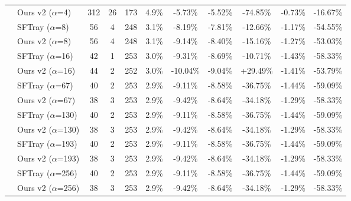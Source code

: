 \begin{table}[t]
{\begin{tabular}{ll|cccc|ccc|cc}
 & Ours v2 ($\alpha$=4) & 312 & 26 & 173 & 4.9\% & -5.73\% & -5.52\% & -74.85\% & -0.73\% & -16.67\% \\

\addlinespace[0.3em]

 & SFTray ($\alpha$=8) & 56 & 4 & 248 & 3.1\% & -8.19\% & -7.81\% & -12.66\% & -1.17\% & -54.55\% \\

 & Ours v2 ($\alpha$=8) & 56 & 4 & 248 & 3.1\% & -9.14\% & -8.40\% & -15.16\% & -1.27\% & -53.03\% \\

\addlinespace[0.3em]

 & SFTray ($\alpha$=16) & 42 & 1 & 253 & 3.0\% & -9.31\% & -8.69\% & -10.71\% & -1.43\% & -58.33\% \\

 & Ours v2 ($\alpha$=16) & 44 & 2 & 252 & 3.0\% & -10.04\% & -9.04\% & +29.49\% & -1.41\% & -53.79\% \\

\addlinespace[0.3em]

 & SFTray ($\alpha$=67) & 40 & 2 & 253 & 2.9\% & -9.11\% & -8.58\% & -36.75\% & -1.44\% & -59.09\% \\

 & Ours v2 ($\alpha$=67) & 38 & 3 & 253 & 2.9\% & -9.42\% & -8.64\% & -34.18\% & -1.29\% & -58.33\% \\

\addlinespace[0.3em]

 & SFTray ($\alpha$=130) & 40 & 2 & 253 & 2.9\% & -9.11\% & -8.58\% & -36.75\% & -1.44\% & -59.09\% \\

 & Ours v2 ($\alpha$=130) & 38 & 3 & 253 & 2.9\% & -9.42\% & -8.64\% & -34.18\% & -1.29\% & -58.33\% \\

\addlinespace[0.3em]

 & SFTray ($\alpha$=193) & 40 & 2 & 253 & 2.9\% & -9.11\% & -8.58\% & -36.75\% & -1.44\% & -59.09\% \\

 & Ours v2 ($\alpha$=193) & 38 & 3 & 253 & 2.9\% & -9.42\% & -8.64\% & -34.18\% & -1.29\% & -58.33\% \\

\addlinespace[0.3em]

 & SFTray ($\alpha$=256) & 40 & 2 & 253 & 2.9\% & -9.11\% & -8.58\% & -36.75\% & -1.44\% & -59.09\% \\

 & Ours v2 ($\alpha$=256) & 38 & 3 & 253 & 2.9\% & -9.42\% & -8.64\% & -34.18\% & -1.29\% & -58.33\% \\


\end{tabular}}
\end{table}
